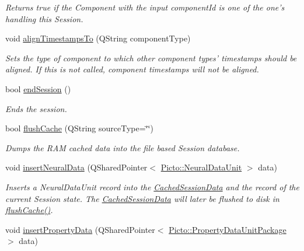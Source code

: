 \begin{DoxyCompactItemize}
\begin{DoxyCompactList}\small\item\em Returns true if the Component with the input component\-Id is one of the one's handling this Session. \end{DoxyCompactList}\item 
void \hyperlink{class_session_info_abdc6f3d0225de15740712135d57d8c5f}{align\-Timestamps\-To} (Q\-String component\-Type)
\begin{DoxyCompactList}\small\item\em Sets the type of component to which other component types' timestamps should be aligned. If this is not called, component timestamps will not be aligned. \end{DoxyCompactList}\item 
bool \hyperlink{class_session_info_ae647cb4d792607c866654e8c908014e1}{end\-Session} ()
\begin{DoxyCompactList}\small\item\em Ends the session. \end{DoxyCompactList}\item 
bool \hyperlink{class_session_info_af4106254bbe6282aae6e79e3b92ece2b}{flush\-Cache} (Q\-String source\-Type=\char`\"{}\char`\"{})
\begin{DoxyCompactList}\small\item\em Dumps the R\-A\-M cached data into the file based Session database. \end{DoxyCompactList}\item 
void \hyperlink{class_session_info_ab46c5d064afd93d1e4ad8d01284c673b}{insert\-Neural\-Data} (Q\-Shared\-Pointer$<$ \hyperlink{class_picto_1_1_neural_data_unit}{Picto\-::\-Neural\-Data\-Unit} $>$ data)
\begin{DoxyCompactList}\small\item\em Inserts a Neural\-Data\-Unit record into the \hyperlink{class_cached_session_data}{Cached\-Session\-Data} and the record of the current Session state. The \hyperlink{class_cached_session_data}{Cached\-Session\-Data} will later be flushed to disk in \hyperlink{class_session_info_af4106254bbe6282aae6e79e3b92ece2b}{flush\-Cache()}. \end{DoxyCompactList}\item 
\hypertarget{class_session_info_acd4949a6188bbbef6af9fb20a9cd8bb7}{void \hyperlink{class_session_info_acd4949a6188bbbef6af9fb20a9cd8bb7}{insert\-Property\-Data} (Q\-Shared\-Pointer$<$ \hyperlink{class_picto_1_1_property_data_unit_package}{Picto\-::\-Property\-Data\-Unit\-Package} $>$ data)}\label{class_session_info_acd4949a6188bbbef6af9fb20a9cd8bb7}


\end{DoxyCompactItemize}
